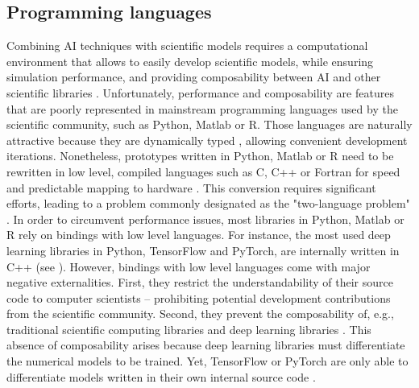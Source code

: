 

\subsection{Programming languages}

Combining AI techniques with scientific models requires a computational environment that allows to easily develop scientific models, while ensuring simulation performance, and providing composability between AI and other scientific libraries \citep{Rackauckas2020}. Unfortunately, performance and composability are features that are poorly represented in mainstream programming languages used by the scientific community, such as Python, Matlab or R.
% 
Those languages are naturally attractive because they are dynamically typed \citep{Bezanson2017}, allowing convenient development iterations. Nonetheless, prototypes written in Python, Matlab or R need to be rewritten in low level, compiled languages such as C, C++ or Fortran for speed and predictable mapping to hardware \citep{Perkel2019,Bezanson2017}. This conversion requires significant efforts, leading to a problem commonly designated as the "two-language problem" \citep{Bezanson2017}.
% 
In order to circumvent performance issues, most libraries in Python, Matlab or R rely on bindings with low level languages. For instance, the most used deep learning libraries in Python, TensorFlow and PyTorch, are internally written in C++ (see \cite{tensorflow,pytorch}). However, bindings with low level languages come with major negative externalities. First, they restrict the understandability of their source code to computer scientists -- prohibiting potential development contributions from the scientific community. Second, they prevent the composability of, e.g., traditional scientific computing libraries and deep learning libraries \citep{Innes2019}. This absence of composability arises because deep learning libraries must differentiate the numerical models to be trained. Yet, TensorFlow or PyTorch are only able to differentiate models written in their own internal source code \citep{Innes2019}.

